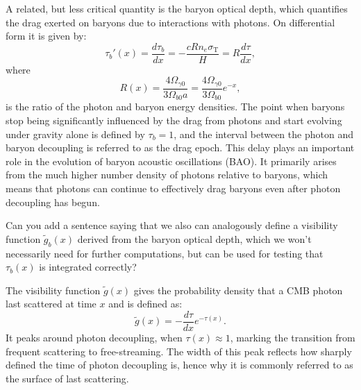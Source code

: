 \documentclass{aa}
\numberwithin{equation}{section}
\numberwithin{table}{section}
\numberwithin{figure}{section}
\begin{document}

A related, but less critical quantity is the baryon optical depth, which quantifies the drag exerted on baryons due to interactions with photons. On differential form it is given by:
\begin{equation}
\tau_b'(x) = \frac{d\tau_b}{dx} = -\frac{c Rn_e \sigma_\text{T}}{H} = R\frac{d\tau}{dx},
\end{equation}
where
\begin{equation}
  R(x) = \frac{4\Omega_{\gamma0}}{3\Omega_{b0}a} = \frac{4\Omega_{\gamma0}}{3\Omega_{b0}}e^{-x}, \label{eq: R}
\end{equation}
is the ratio of the photon and baryon energy densities. The point when baryons stop being significantly influenced by the drag from photons and start evolving under gravity alone is defined by $\tau_b = 1$, and the interval between the photon and baryon decoupling is referred to as the drag epoch. This delay plays an important role in the evolution of baryon acoustic oscillations (BAO). It primarily arises from the much higher number density of photons relative to baryons, which means that photons can continue to effectively drag baryons even after photon decoupling has begun.

Can you add a sentence saying that we also can analogously define a visibility function $\tilde{g}_b(x)$ derived from the baryon optical depth, which we won't necessarily need for further computations, but can be used for testing that $\tau_b(x)$ is integrated correctly?

The visibility function $\tilde{g}(x)$ gives the probability density that a CMB photon last scattered at time $x$ and is defined as:
\begin{equation}
\tilde{g}(x) = -\frac{d\tau}{dx} e^{-\tau(x)}.
\end{equation}
It peaks around photon decoupling, when $\tau(x) \approx 1$, marking the transition from frequent scattering to free-streaming. The width of this peak reflects how sharply defined the time of photon decoupling is, hence why it is commonly referred to as the surface of last scattering. 
\end{document}
